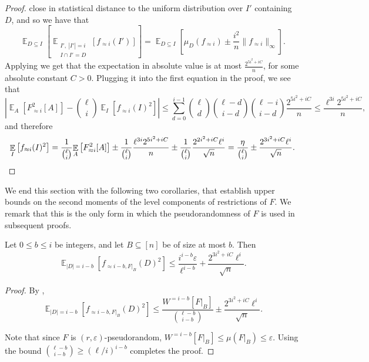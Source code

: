 \documentclass{toc}
\newcommand\card[1]{\left| {#1} \right|}
\newcommand\Expect[2]{{\mathop{\mathbb{E}}_{#1}\left[ {#2} \right]}}
\newcommand\norm[1]{\| #1 \|}
\newcommand\eps{\varepsilon}
\renewcommand\geq{\geqslant}
\renewcommand\leq{\leqslant}
\newcommand\approxlvlfn[2]{{#1}_{\approx{#2}}}
\begin{document}
\begin{proof}
close in statistical distance to the uniform distribution over $I'$ containing $D$, and so we have that
\[
\Expect{D\subseteq I}{\Expect{\substack{I', ~\card{I'} = i\\ I\cap I'=D}}{
\approxlvlfn{f}{i}(I')}}
=
\Expect{D\subseteq I}{\mu_D(\approxlvlfn{f}{i})\pm \frac{i^2}{n}\norm{\approxlvlfn{f}{i}}_{\infty}}.
\]
Applying  
we get that the expectation in absolute value is at most $\frac{2^{5i^2 + iC}}{n}$, for some absolute constant $C>0$.
Plugging it into the first equation in the proof, we see that
\[
\card{
\Expect{A}{\approxlvlfn{F}{i}^2[A]}
-
{\ell \choose i}\Expect{I}{\approxlvlfn{f}{i}(I)^2}
}
\leq \sum\limits_{d=0}^{i-1}{
{\ell \choose d}{\ell - d \choose i-d}{\ell - i \choose i-d}
\frac{2^{5i^2+iC}}{n}}
\leq \frac{\ell^{3i} 2^{5i^2+iC}}{n},
\]
and therefore
\[
\Expect{I}{\approxlvlfn{f}{i}(I)^2}
=\frac{1}{{\ell\choose i}} \Expect{A}{\approxlvlfn{F}{i}^2[A]}
\pm \frac{1}{{\ell\choose i}} \frac{\ell^{3i} 2^{5i^2+iC}}{n}
\pm \frac{1}{{\ell\choose i}} \frac{2^{2i^2+iC} \ell^{i}}{\sqrt{n}}
=\frac{\eta}{{\ell\choose i}}
\pm \frac{2^{3i^2+iC} \ell^{i}}{\sqrt{n}}.
\qedhere           %
\]
\end{proof}



We end this section with the following two corollaries, that establish upper bounds on the
second moments of the level components of restrictions of $F$. We remark that this
is the only form in which the pseudorandomness of $F$ is used in subsequent proofs.
\begin{corollary}\label{corr:rest_basic}
Let $0\leq b\leq i$ be integers, and let $B\subseteq [n]$ be of size at most $b$. Then
\[
\Expect{\card{D} = i-b}{\approxlvlfn{f}{i-b, F|_B}(D)^2}
\leq \frac{i^{i-b} \eps }{\ell^{i-b}} + \frac{2^{3i^2+iC} \ell^{i}}{\sqrt{n}}.
\]
\end{corollary}
\begin{proof}
By ,
\[
\Expect{\card{D} = i-b}{\approxlvlfn{f}{i-b, F|_B}(D)^2}
\leq \frac{W^{=i-b}[F|_B]}{{\ell - b \choose i-b}}\pm \frac{2^{3i^2+iC} \ell^{i}}{\sqrt{n}}.
\]

Note that since $F$ is $(r,\eps)$-pseudorandom, $W^{=i-b}[F|_B] \leq \mu(F|_B) \leq\eps$.
Using the bound ${\ell-b \choose i-b}\geq (\ell/i)^{i-b}$ completes the proof.
\end{proof}
\end{document}

